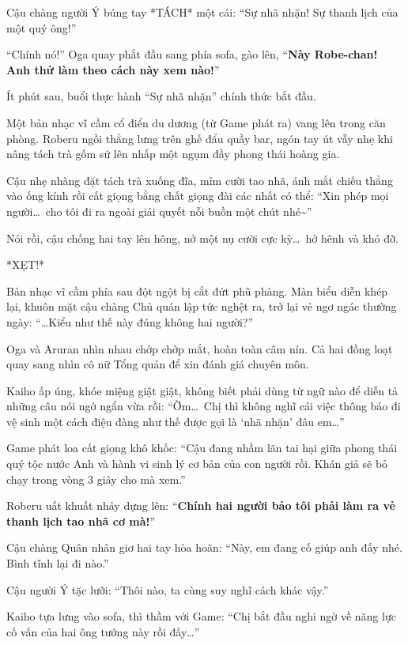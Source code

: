 \documentclass[../main.tex]{subfiles}
\begin{document}
Cậu chàng người Ý búng tay *TÁCH* một cái: ``Sự nhã nhặn! Sự thanh lịch của một quý ông!''

``Chính nó!'' Oga quay phắt đầu sang phía sofa, gào lên, ``\textbf{Này Robe-chan! Anh thử làm theo cách này xem nào!}''

\ct

Ít phút sau, buổi thực hành ``Sự nhã nhặn'' chính thức bắt đầu.

Một bản nhạc vĩ cầm cổ điển du dương (từ Game phát ra) vang lên trong căn phòng. Roberu ngồi thẳng lưng trên ghế đẩu quầy bar, ngón tay út vẫy nhẹ khi nâng tách trà gốm sứ lên nhấp một ngụm đầy phong thái hoàng gia.

Cậu nhẹ nhàng đặt tách trà xuống đĩa, mỉm cười tao nhã, ánh mắt chiếu thẳng vào ống kính rồi cất giọng bằng chất giọng đài các nhất có thể: ``Xin phép mọi người\dots\ cho tôi đi ra ngoài giải quyết nỗi buồn một chút nhé\~{}''


Nói rồi, cậu chống hai tay lên hông, nở một nụ cười cực kỳ\dots\ hớ hênh và khó đỡ.

*XẸT!*

Bản nhạc vĩ cầm phía sau đột ngột bị cắt đứt phũ phàng. Màn biểu diễn khép lại, khuôn mặt cậu chàng Chủ quán lập tức nghệt ra, trở lại vẻ ngơ ngác thường ngày: ``\dots Kiểu như thế này đúng không hai người?''

Oga và Aruran nhìn nhau chớp chớp mắt, hoàn toàn câm nín. Cả hai đồng loạt quay sang nhìn cô nữ Tổng quản để xin đánh giá chuyên môn.

Kaiho ấp úng, khóe miệng giật giật, không biết phải dùng từ ngữ nào để diễn tả những câu nói ngớ ngẩn vừa rồi: ``Ờm\dots\ Chị thì không nghĩ cái việc thông báo đi vệ sinh một cách điệu đàng như thế được gọi là `nhã nhặn' đâu em\dots''

Game phát loa cất giọng khô khốc: ``Cậu đang nhầm lãn tai hại giữa phong thái quý tộc nước Anh và hành vi sinh lý cơ bản của con người rồi. Khán giả sẽ bỏ chạy trong vòng 3 giây cho mà xem.''

Roberu uất khuất nhảy dựng lên: ``\textbf{Chính hai người bảo tôi phải làm ra vẻ thanh lịch tao nhã cơ mà!}''

Cậu chàng Quân nhân giơ hai tay hòa hoãn: ``Này, em đang cố giúp anh đấy nhé. Bình tĩnh lại đi nào.''

Cậu người Ý tặc lưỡi: ``Thôi nào, ta cùng suy nghĩ cách khác vậy.''

Kaiho tựa lưng vào sofa, thì thầm với Game: ``Chị bắt đầu nghi ngờ về năng lực cố vấn của hai ông tướng này rồi đấy\dots''
\end{document}
